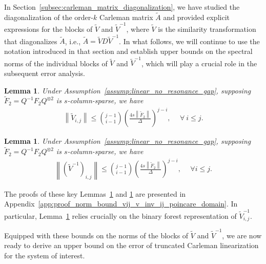 \documentclass[superscriptaddress,onecolumn,nofootinbib,longbibliography,a4paper,accepted=2026-09-29]{quantumarticle}
\theoremstyle{plain}
\newtheorem{lemma}[thm]{Lemma}
\theoremstyle{definition}
\numberwithin{thm}{section}
\numberwithin{assumption}{section}
\numberwithin{lemma}{section}
\numberwithin{prop}{section}
\numberwithin{cor}{section}
\numberwithin{definition}{section}
\numberwithin{rmk}{section}
\numberwithin{equation}{section}
\newcommand{\norm}[1]     {\left\| #1 \right\|}
\newcommand{\lrb}[1]{\left ( #1 \right )}
\begin{document}
In Section~\ref{subsec:carleman_matrix_diagonalization}, we have studied the diagonalization of the order-$k$ Carleman matrix \( \tilde{A} \) and provided explicit expressions for the blocks of \( \tilde{V} \) and \( \tilde{V}^{-1} \), where \( \tilde{V} \) is the similarity transformation that diagonalizes \( \tilde{A} \), i.e., \( \tilde{A} = \tilde{V} D \tilde{V}^{-1} \). In what follows, we will continue to use the notation introduced in that section and establish upper bounds on the spectral norms of the individual blocks of \( \tilde{V} \) and \( \tilde{V}^{-1} \), which will play a crucial role in the subsequent error analysis.


\begin{lemma}
Under Assumption~\ref{assump:linear_no_resonance_gap}, supposing $\tilde{F}_2 = Q^{-1}F_2 Q^{\otimes 2}$ is $s$-column-sparse, we have 
\begin{align}
\norm{\tilde{V}_{i,j}} \le \binom{j-1}{i-1} \lrb{\frac{4s\norm{\tilde{F}_2}}{\Delta}}^{j-i},~&~\forall~i \le j.
\end{align}
\label{lem:vij_norm_bound_poincare_domain}
\end{lemma}

\begin{lemma}
Under Assumption~\ref{assump:linear_no_resonance_gap}, supposing $\tilde{F}_2 = Q^{-1}F_2 Q^{\otimes 2}$ is $s$-column-sparse, we have 
\begin{align}
\norm{\lrb{\tilde{V}^{-1}}_{i,j}} \le \binom{j-1}{i-1}\lrb{\frac{4s\norm{\tilde{F}_2}}{\Delta}}^{j-i},~&~\forall i \le j.
\end{align}
\label{lem:wij_norm_bound_poincare_domain}    
\end{lemma}

The proofs of these key Lemmas~\ref{lem:vij_norm_bound_poincare_domain} and \ref{lem:wij_norm_bound_poincare_domain} are presented in 
Appendix~\ref{app:proof_norm_bound_vij_v_inv_ij_poincare_domain}. In particular,  Lemma~\ref{lem:wij_norm_bound_poincare_domain} relies crucially on the binary forest representation of $\tilde{V}^{-1}_{i,j}$.

Equipped with these bounds on the norms of the blocks of $\tilde{V}$ and $\tilde{V}^{-1}$, we are now ready to derive an upper bound on the error of truncated Carleman linearization for the system of interest.
\end{document}
